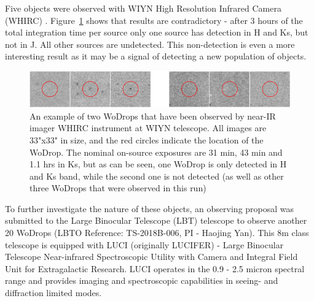 Five objects were observed with WIYN High Resolution Infrared Camera (WHIRC) \citep{Smee2011a}. Figure~\ref{fig:wodrop_whirc} shows that results are contradictory - after 3 hours of the total integration time per source only one source has detection in H and Ks, but not in J. All other sources are undetected. This non-detection is even a more interesting result as it may be a signal of detecting a new population of objects. 

\begin{figure}[!ht]
\includegraphics[width=6in]{Figures/wodrop_whirc.png}
\caption{An example of two WoDrops that have been observed by near-IR imager WHIRC instrument at WIYN telescope. All images are 33"x33" in size, and the red circles indicate the location of the WoDrop. The nominal on-source exposures are 31 min, 43 min and 1.1 hrs in Ks, but as can be seen, one WoDrop is only detected in H and Ks band, while the second one is not detected (as well as other three WoDrops that were observed in this run)}
\label{fig:wodrop_whirc}
\end{figure}

To further investigate the nature of these objects, an observing proposal was submitted to the Large Binocular Telescope (LBT) telescope to observe another 20 WoDrops (LBTO Reference: TS-2018B-006, PI - Haojing Yan). This 8m class telescope is equipped with LUCI (originally LUCIFER) - Large Binocular Telescope Near-infrared Spectroscopic Utility with Camera and Integral Field Unit for Extragalactic Research. LUCI operates in the 0.9 - 2.5 micron spectral range and provides imaging and spectroscopic capabilities in seeing- and diffraction limited modes.
